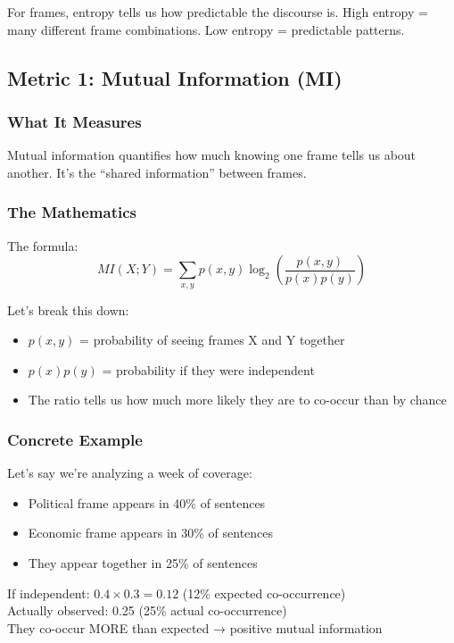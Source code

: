 \documentclass[11pt]{article}
\begin{document}
For frames, entropy tells us how predictable the discourse is. High entropy = many different frame combinations. Low entropy = predictable patterns.

\subsection{Metric 1: Mutual Information (MI)}

\subsubsection{What It Measures}
Mutual information quantifies how much knowing one frame tells us about another. It's the ``shared information'' between frames.

\subsubsection{The Mathematics}

The formula:
\[MI(X;Y) = \sum_{x,y} p(x,y) \log_2\left(\frac{p(x,y)}{p(x)p(y)}\right)\]

Let's break this down:
\begin{itemize}
    \item $p(x,y)$ = probability of seeing frames X and Y together
    \item $p(x)p(y)$ = probability if they were independent
    \item The ratio tells us how much more likely they are to co-occur than by chance
\end{itemize}

\subsubsection{Concrete Example}

Let's say we're analyzing a week of coverage:
\begin{itemize}
    \item Political frame appears in 40\% of sentences
    \item Economic frame appears in 30\% of sentences
    \item They appear together in 25\% of sentences
\end{itemize}

If independent: $0.4 \times 0.3 = 0.12$ (12\% expected co-occurrence)\\
Actually observed: 0.25 (25\% actual co-occurrence)\\
They co-occur MORE than expected → positive mutual information
\end{document}
